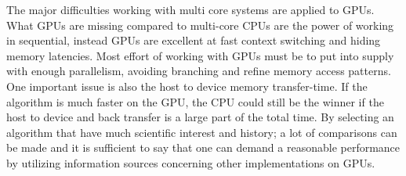 The major difficulties working with multi core systems are applied to GPUs. What GPUs are missing compared to multi-core CPUs are the power of working in sequential, instead GPUs are excellent at fast context switching and hiding memory latencies. Most effort of working with GPUs must be to put into supply with enough parallelism, avoiding branching and refine memory access patterns. One important issue is also the host to device memory transfer-time. If the algorithm is much faster on the GPU, the CPU could still be the winner if the host to device and back transfer is a large part of the total time.
By selecting an algorithm that have much scientific interest and history; a lot of comparisons can be made and it is sufficient to say that one can demand a reasonable performance by utilizing information sources concerning other implementations on GPUs. 

